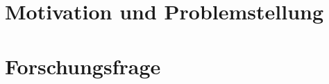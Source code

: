 \documentclass[
    paper=a4,
    bibtotocnumbered,
    liststotocnumbered,
    oneside,
    12pt,
    listof=totoc,
    toc=chapterentrywithdots,
    listof=entryprefix,
]{scrreprt}
\begin{document}

\chapter{Motivation und Problemstellung}
\blindtext

\chapter{Forschungsfrage}
\blindtext




% 
% 

% 
\end{document}
